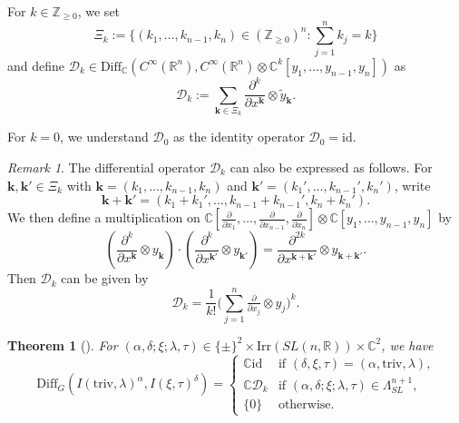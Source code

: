 \documentclass[reqno,11pt]{amsart}
\newtheorem{thm}[equation]{Theorem}
\theoremstyle{remark}
\newtheorem{rem}[equation]{Remark}
\theoremstyle{definition}
\numberwithin{equation}{section}
\newcommand{\ga}{\alpha}
\newcommand{\R}{\mathbb{R}}
\newcommand{\C}{\mathbb{C}}
\newcommand{\Z}{\mathbb{Z}}
\newcommand{\Cal}{\mathcal}
\newcommand{\Diff}{\mathrm{Diff}}
\newcommand{\Irr}{\mathrm{Irr}}
\newcommand{\triv}{\mathrm{triv}}
\newcommand{\id}{\mathrm{id}}
\newcommand{\D}{\Cal{D}}
\begin{document}
\noindent
For $k \in \Z_{\geq 0}$, we set
\begin{equation*}
\Xi_k:=\{(k_1, \ldots, k_{n-1}, k_n) \in (\Z_{\geq 0})^{n} : \sum_{j=1}^{n} 
k_j= k\}
\end{equation*}
and define $\D_k \in \Diff_\C(C^\infty(\R^{n}), C^\infty(\R^{n})\otimes 
\C^k[y_1, \ldots, y_{n-1}, y_{n}])$ as
\begin{equation}\label{eqn:IDO}
\D_k := 
\sum_{\mathbf{k} \in \Xi_k} \frac{\partial^k}{\partial x^{\mathbf{k}}}
\otimes \widetilde{y}_{\mathbf{k}}.
\end{equation}

\noindent
For $k=0$, we understand $\D_0$ as the identity operator $\D_0 = \id$.

\begin{rem}
The differential operator $\D_k$ can also be expressed as follows. 
For $\mathbf{k}, \mathbf{k}' \in \Xi_k$ with
$\mathbf{k}= (k_1, \ldots, k_{n-1}, k_n)$ and  
$\mathbf{k}'= (k_1', \ldots, k_{n-1}', k_n')$,
write
\begin{equation*}
\mathbf{k}+\mathbf{k}' = 
(k_1+k_1', \ldots, k_{n-1}+k_{n-1}', k_n+k_n').
\end{equation*}
We then define
a multiplication on 
$
\C[\tfrac{\partial}{\partial x_1}, \ldots, \tfrac{\partial}{\partial x_{n-1}},
\tfrac{\partial}{\partial x_n}]
\otimes
\C[y_1, \ldots, y_{n-1}, y_{n}]
$
by
\begin{equation*}
(\frac{\partial^k}{\partial x^{\mathbf{k}}} \otimes y_{\mathbf{k}})
\cdot
(\frac{\partial^k}{\partial x^{\mathbf{k}'}} \otimes y_{\mathbf{k}'})
=
\frac{\partial^{2k}}{\partial x^{\mathbf{k}+\mathbf{k}'}} 
\otimes y_{\mathbf{k}+\mathbf{k}'}.
\end{equation*}
Then $\D_k$ can be given by
\begin{equation*}
\D_k 
=
\frac{1}{k!} 
\big(
\sum_{j=1}^n \tfrac{\partial}{\partial x_j} \otimes y_j
\big)^k.
\end{equation*}

\end{rem}

\begin{thm}[{\cite[Thm.\ 4.5]{KuOr24}}]
For $(\ga, \delta; \xi; \lambda, \tau) \in \{\pm\}^2 \times 
\Irr(SL(n,\R)) \times \C^2$,
we have
\begin{equation*}
\Diff_G(I(\triv, \lambda)^\alpha, I(\xi, \tau)^\delta)
=
\begin{cases}
\C\id & \text{if $(\delta, \xi, \tau) = (\alpha, \triv, \lambda)$,}\\
\C \D_k & \text{if $(\alpha, \delta;\xi; \lambda, \tau)\in \Lambda^{n+1}_{SL}$,}\\
\{0\} & \text{otherwise.}
\end{cases}
\end{equation*}
\end{thm}
\end{document}

